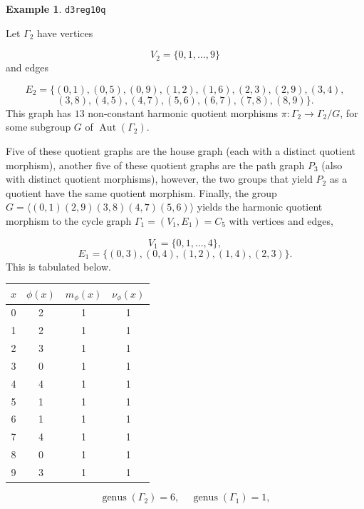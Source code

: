 \documentclass[12pt,letterpaper]{article}
\theoremstyle{definition}
\newtheorem{example}[theorem]{Example}
\DeclareMathOperator{\Aut}{Aut}
\DeclareMathOperator{\genus}{genus}
\begin{document}
\begin{example}%
\label{example:d3reg10q}
  {\tt d3reg10q}\newline
{\rm  
Let $\Gamma_2$ have vertices

\[
V_2=\{0,1,\dots,9\}
\]
and edges

\[
E_2 = \{
(0, 1), (0, 5), (0, 9), (1, 2), (1, 6), (2, 3), (2, 9), (3, 4), 
\]
\[
(3, 8), (4, 5), (4, 7), (5, 6), (6, 7), (7, 8), (8, 9)
\}.
\]
This graph has $13$ non-constant harmonic quotient
morphisms $\pi: \Gamma_2\to \Gamma_2/G$, for some subgroup
$G$ of $\Aut(\Gamma_2)$.

Five of these quotient graphs are the house graph (each with a
distinct quotient morphism),
another five of these quotient graphs are the path graph $P_3$
(also with distinct quotient morphisms), 
however, the two groups that yield $P_2$ as a quotient have the
same quotient morphism.
Finally, the
 group $G = \langle (0,1)(2,9)(3,8)(4,7)(5,6) \rangle$ yields the
harmonic quotient morphism to the cycle graph
$\Gamma_1 = (V_1,E_1) = C_5$
with vertices and edges,

\[
V_1=\{0,1,\dots, 4\},
\]
\[
E_1=\{
(0, 3), (0, 4), (1, 2), (1, 4), (2, 3)
\}.
\]
This is tabulated below.

\begin{center}
\begin{tabular}{c|c|c|c}  
  $x$ & $\phi(x)$ & $m_\phi(x)$ & $\nu_\phi(x)$ \\ \hline
  0   &    2   &        1         &  1   \\ 
  1   &    2   &        1         &  1   \\ 
  2   &    3   &        1         &  1   \\ 
  3   &    0   &        1         &  1   \\ 
  4   &    4   &        1         &  1   \\ 
  5   &    1   &        1         &  1    \\ 
  6   &    1   &        1         &  1   \\ 
  7   &    4   &        1         &  1   \\
  8   &    0   &        1         &  1   \\
  9   &    3   &        1         &  1   \\ 
\end{tabular}
\end{center}

\[
  \genus(\Gamma_2) =6,\ \ \ \ \
  \genus(\Gamma_1) =1,
\]

}
\end{example}
\end{document}
